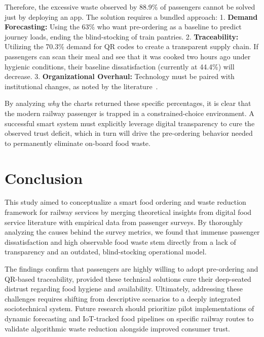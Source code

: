 \documentclass[conference]{IEEEtran}
\begin{document}
Therefore, the excessive waste observed by 88.9\% of passengers cannot be solved just by deploying an app. The solution requires a bundled approach:
1. \textbf{Demand Forecasting:} Using the 63\% who want pre-ordering as a baseline to predict journey loads, ending the blind-stocking of train pantries.
2. \textbf{Traceability:} Utilizing the 70.3\% demand for QR codes to create a transparent supply chain. If passengers can scan their meal and see that it was cooked two hours ago under hygienic conditions, their baseline dissatisfaction (currently at 44.4\%) will decrease.
3. \textbf{Organizational Overhaul:} Technology must be paired with institutional changes, as noted by the literature~\cite{ijam2025,ce4re2025}. 

By analyzing \textit{why} the charts returned these specific percentages, it is clear that the modern railway passenger is trapped in a constrained-choice environment. A successful smart system must explicitly leverage digital transparency to cure the observed trust deficit, which in turn will drive the pre-ordering behavior needed to permanently eliminate on-board food waste.

\section{Conclusion}

This study aimed to conceptualize a smart food ordering and waste reduction framework for railway services by merging theoretical insights from digital food service literature with empirical data from passenger surveys. By thoroughly analyzing the causes behind the survey metrics, we found that immense passenger dissatisfaction and high observable food waste stem directly from a lack of transparency and an outdated, blind-stocking operational model. 

The findings confirm that passengers are highly willing to adopt pre-ordering and QR-based traceability, provided these technical solutions cure their deep-seated distrust regarding food hygiene and availability. Ultimately, addressing these challenges requires shifting from descriptive scenarios to a deeply integrated sociotechnical system. Future research should prioritize pilot implementations of dynamic forecasting and IoT-tracked food pipelines on specific railway routes to validate algorithmic waste reduction alongside improved consumer trust.
\end{document}

